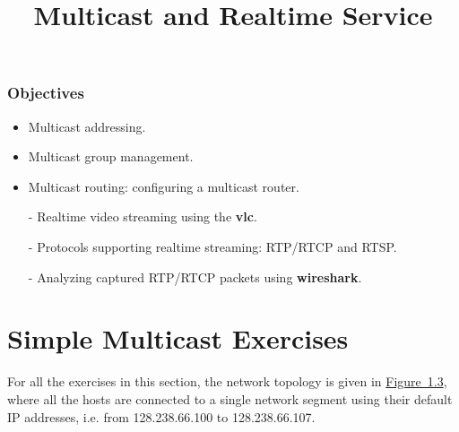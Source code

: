 \documentclass{../UTNetLab}
\title{Multicast and Realtime Service}
\begin{document}
\section*{Objectives}
\begin{itemize}
    \item Multicast addressing.
    \item Multicast group management.
    \item Multicast routing: configuring a multicast router.
    \item [-] Realtime video streaming using the \textbf{vlc}.
    \item [-] Protocols supporting realtime streaming: RTP/RTCP and RTSP.
    \item [-] Analyzing captured RTP/RTCP packets using \textbf{wireshark}.
\end{itemize}

\part{Simple Multicast Exercises}\label{sec:simple-multicast}
For all the exercises in this section, the network topology is given in \hyperref[fig:1.3]{Figure~1.3}, where all the hosts are connected to a single network segment using their default IP addresses, i.e. from 128.238.66.100 to 128.238.66.107.
\end{document}
